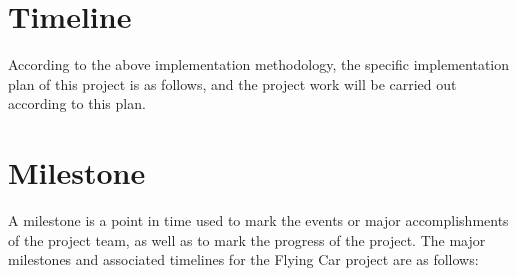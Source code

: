 \section{Timeline}

According to the above implementation methodology, the specific implementation plan of this project is as follows, and the project work will be carried out according to this plan.

{\color{red}{甘特图}}

\section{Milestone}

A milestone is a point in time used to mark the events or major accomplishments of the project team, as well as to mark the progress of the project. The major milestones and associated timelines for the Flying Car project are as follows:


